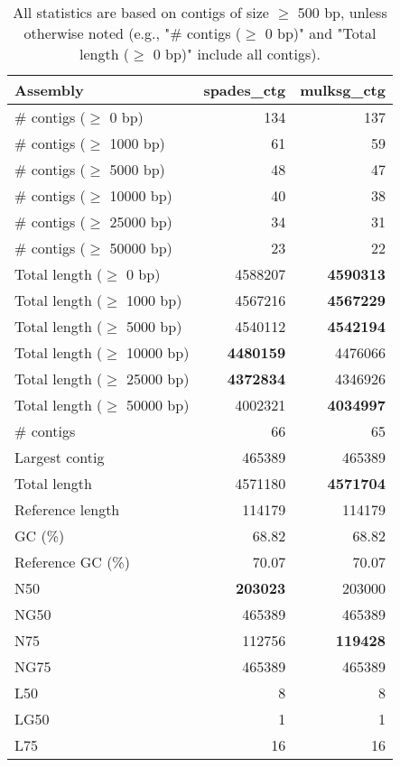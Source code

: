 \documentclass[12pt,a4paper]{article}
\begin{document}
\begin{table}[ht]
\begin{center}
\caption{All statistics are based on contigs of size $\geq$ 500 bp, unless otherwise noted (e.g., "\# contigs ($\geq$ 0 bp)" and "Total length ($\geq$ 0 bp)" include all contigs).}
\begin{tabular}{|l*{2}{|r}|}
\hline
Assembly & spades\_ctg & mulksg\_ctg \\ \hline
\# contigs ($\geq$ 0 bp) & 134 & 137 \\ \hline
\# contigs ($\geq$ 1000 bp) & 61 & 59 \\ \hline
\# contigs ($\geq$ 5000 bp) & 48 & 47 \\ \hline
\# contigs ($\geq$ 10000 bp) & 40 & 38 \\ \hline
\# contigs ($\geq$ 25000 bp) & 34 & 31 \\ \hline
\# contigs ($\geq$ 50000 bp) & 23 & 22 \\ \hline
Total length ($\geq$ 0 bp) & 4588207 & {\bf 4590313} \\ \hline
Total length ($\geq$ 1000 bp) & 4567216 & {\bf 4567229} \\ \hline
Total length ($\geq$ 5000 bp) & 4540112 & {\bf 4542194} \\ \hline
Total length ($\geq$ 10000 bp) & {\bf 4480159} & 4476066 \\ \hline
Total length ($\geq$ 25000 bp) & {\bf 4372834} & 4346926 \\ \hline
Total length ($\geq$ 50000 bp) & 4002321 & {\bf 4034997} \\ \hline
\# contigs & 66 & 65 \\ \hline
Largest contig & 465389 & 465389 \\ \hline
Total length & 4571180 & {\bf 4571704} \\ \hline
Reference length & 114179 & 114179 \\ \hline
GC (\%) & 68.82 & 68.82 \\ \hline
Reference GC (\%) & 70.07 & 70.07 \\ \hline
N50 & {\bf 203023} & 203000 \\ \hline
NG50 & 465389 & 465389 \\ \hline
N75 & 112756 & {\bf 119428} \\ \hline
NG75 & 465389 & 465389 \\ \hline
L50 & 8 & 8 \\ \hline
LG50 & 1 & 1 \\ \hline
L75 & 16 & 16 \\ \hline

\end{tabular}
\end{center}
\end{table}
\end{document}
